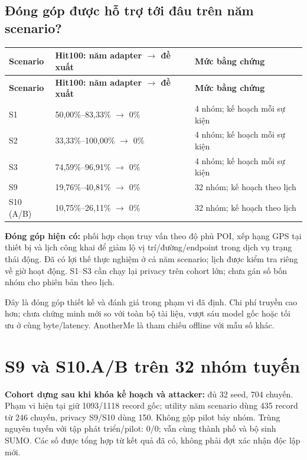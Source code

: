 \documentclass[10pt,a4paper]{article}
\begin{document}
\subsection{Đóng góp được hỗ trợ tới đâu trên năm scenario?}
\begingroup\small
\begin{longtable}{@{}P{2.560cm}P{6.596cm}P{7.482cm}@{}}
\toprule
\textbf{Scenario} & \textbf{Hit100: năm adapter $\to$ đề xuất} & \textbf{Mức bằng chứng}\\\midrule
\endfirsthead
\toprule
\textbf{Scenario} & \textbf{Hit100: năm adapter $\to$ đề xuất} & \textbf{Mức bằng chứng}\\\midrule
\endhead
\bottomrule\endfoot
S1 & 50,00\%–83,33\% $\to$ 0\% & 4 nhóm; kế hoạch mỗi sự kiện\\
\addlinespace[3pt]
S2 & 33,33\%–100,00\% $\to$ 0\% & 4 nhóm; kế hoạch mỗi sự kiện\\
\addlinespace[3pt]
S3 & 74,59\%–96,91\% $\to$ 0\% & 4 nhóm; kế hoạch mỗi sự kiện\\
\addlinespace[3pt]
S9 & 19,76\%–40,81\% $\to$ 0\% & 32 nhóm; kế hoạch theo lịch\\
\addlinespace[3pt]
S10 (A/B) & 10,75\%–26,11\% $\to$ 0\% & 32 nhóm; kế hoạch theo lịch\\
\end{longtable}
\endgroup
\textbf{Đóng góp hiện có:} phối hợp chọn truy vấn theo độ phủ POI, xếp hạng GPS tại thiết bị và lịch công khai để giảm lộ vị trí/đường/endpoint trong dịch vụ trạng thái động. Đã có lợi thế thực nghiệm ở cả năm scenario; lịch được kiểm tra riêng về giờ hoạt động. S1–S3 cần chạy lại privacy trên cohort lớn; chưa gán số bốn nhóm cho phiên bản theo lịch.

Đây là đóng góp thiết kế và đánh giá trong phạm vi đã định. Chi phí truyền cao hơn; chưa chứng minh mới so với toàn bộ tài liệu, vượt sáu model gốc hoặc tối ưu ở cùng byte/latency. AnotherMe là tham chiếu offline với mẫu số khác.


\clearpage
\section{S9 và S10.A/B trên 32 nhóm tuyến}
\textbf{Cohort dựng sau khi khóa kế hoạch và attacker:} đủ 32 seed, 704 chuyến. Phạm vi hiện tại giữ 1093/1118 record gốc; utility năm scenario dùng 435 record từ 246 chuyến, privacy S9/S10 dùng 150. Không gộp pilot bảy nhóm. Trùng nguyên tuyến với tập phát triển/pilot: 0/0; vẫn cùng thành phố và bộ sinh SUMO. Các số được tổng hợp từ kết quả đã có, không phải đợt xác nhận độc lập mới.
\end{document}
